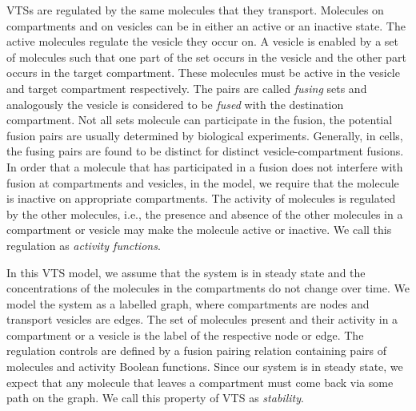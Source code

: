 VTSs are regulated by the same molecules that they transport. Molecules on compartments and on vesicles can be in either an active or an inactive state.
%
%
The active molecules regulate the vesicle they occur on.
%
A vesicle is enabled by a set of molecules
such that one part of the set occurs in the vesicle and the other part
occurs in the target compartment.
%
These molecules must be active in the vesicle
and target compartment respectively.
%
The pairs are called {\em fusing} sets and analogously
the vesicle is considered to be {\em fused} with the
destination compartment.
%
Not all sets molecule can participate in the fusion, the
potential fusion pairs are usually determined by biological experiments.
%
Generally, in cells, the fusing pairs are found to be distinct for distinct vesicle-compartment fusions.
%
In order that a molecule that has participated in a fusion does not interfere
with fusion at compartments and vesicles, in the model, we require that the molecule is inactive on appropriate compartments.
%
%
The activity of molecules is regulated by the other molecules, i.e.,
the presence and absence of the other molecules in a compartment or
vesicle may make the molecule active or inactive.
%
We call this regulation as {\em activity functions}.

%
In this VTS model, we assume that the system is in steady state and the
concentrations of the molecules in the compartments do not change over
time.
%
We model the system as a labelled graph, where compartments are nodes and
transport vesicles are edges.
%
The set of molecules present and their activity in a compartment or
a vesicle is the label of the respective node or edge.
%
The regulation controls are defined by a fusion pairing relation
containing pairs of molecules and activity
Boolean functions.
%
Since our system is in steady state, we expect that any molecule that
leaves a compartment must come back via some path on the graph.
%
We call this property of VTS as {\em stability}.

